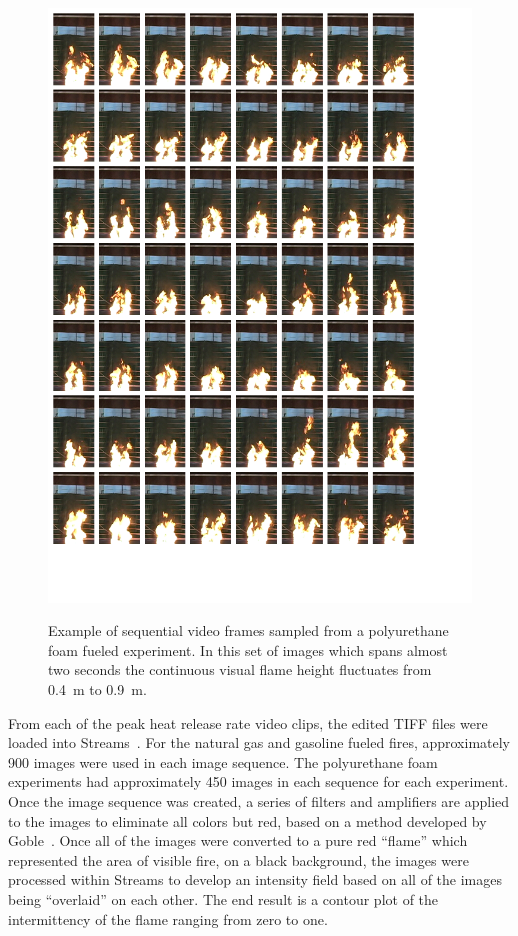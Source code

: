 \documentclass[twoside]{uocthesis}
\begin{document}
{{\begin{figure}
	\centering
	\includegraphics[width=\textwidth]{../Figures/flame_height_comp_FHPUF}\\
	\caption[Example of sequential video frames sampled from a polyurethane foam fueled experiment]{Example of sequential video frames sampled from a polyurethane foam fueled experiment.  In this set of images which spans almost two seconds the continuous visual flame height fluctuates from 0.4~m to 0.9~m.}
	\label{flame_height_comp_FHPUF_1}
\end{figure}


From each of the peak heat release rate video clips, the edited TIFF files were loaded into Streams~\cite{Nokes:2011}.  For the natural gas and gasoline fueled fires, approximately 900 images were used in each image sequence.  The polyurethane foam experiments had approximately 450 images in each sequence for each experiment.  Once the image sequence was created, a series of filters and amplifiers are applied to the images to eliminate all colors but red, based on a method developed by Goble~\cite{Goble:2007}.  Once all of the images were converted to a pure red ``flame'' which represented the area of visible fire, on a black background, the images were processed within Streams to develop an intensity field based on all of the images being ``overlaid'' on each other.  The end result is a contour plot of the intermittency of the flame ranging from zero to one.

}}
\end{document}
